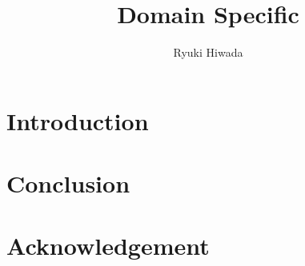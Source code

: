 \documentclass{jarticle}
\author{Ryuki Hiwada}
\title{Domain Specific }
\begin{document}
\maketitle
\section{Introduction}

\section{Conclusion}
\section*{Acknowledgement}

\end{document}
